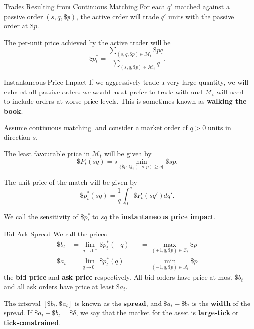\documentclass{beamer}
\begin{document}
\begin{frame}{Trades Resulting from Continuous Matching}
	For each $q'$ matched against a passive order $(s,q,\$p)$, the active order will trade $q'$ units with the passive order at $\$p$. %

	The per-unit price achieved by the active trader will be
	$$\$p^*_t = \frac{\sum_{(s,q,\$p)\in\mathcal{M}_t} \$pq}{\sum_{(s,q,\$p)\in\mathcal{M}_t} q}.$$ %
\end{frame}

\begin{frame}{Instantaneous Price Impact}
	If we aggressively trade a very large quantity, we will exhaust all passive orders we would most prefer to trade with and $\mathcal{M}_t$ will need to include orders at worse price levels. This is sometimes known as \textbf{walking the book}.

	Assume continuous matching, and consider a market order of $q>0$ units in direction $s$.

	The least favourable price in $\mathcal{M}_t$ will be given by
	$$\$P_t(sq) = s\min_{\{\$p : Q_t(-s,p)\geq q\}} \$sp.$$

	The unit price of the match will be given by
	$$\$p^*_t(sq) = \frac{1}{q}\int_0^q \$P_t(sq')dq'.$$

	We call the sensitivity of $\$p^*_t$ to $sq$ the \textbf{instantaneous price impact}.%
\end{frame}

\begin{frame}{Bid-Ask Spread}
	We call the prices
	\begin{align*}
		\$b_t	&= \lim_{q\to0^+} \$p^*_t(-q)	&&= \max_{(+1,q,\$p)\in\mathcal{B}_t} \$p
	\\	\$a_t	&= \lim_{q\to0^+} \$p^*_t(q)	&&= \min_{(-1,q,\$p)\in\mathcal{A}_t} \$p
	\end{align*}
	the \textbf{bid price} and \textbf{ask price} respectively. All bid orders have price at most $\$b_t$ and all ask orders have price at least $\$a_t$.%

	The interval $[\$b_t,\$a_t]$ is known as the \textbf{spread}, and $\$a_t-\$b_t$ is the \textbf{width} of the spread. If $\$a_t-\$b_t=\$\delta$, we say that the market for the asset is \textbf{large-tick} or \textbf{tick-constrained}.%
\end{frame}
\end{document}

